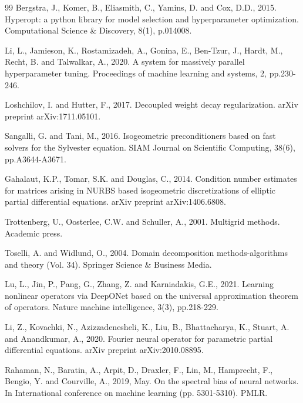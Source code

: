 \documentclass{article}
\theoremstyle{plain}
\numberwithin{equation}{section}
\begin{document}
\begin{thebibliography}{99}
    Bergstra, J., Komer, B., Eliasmith, C., Yamins, D. and Cox, D.D., 2015. Hyperopt: a python library for model selection and hyperparameter optimization. Computational Science $\&$ Discovery, 8(1), p.014008.

    Li, L., Jamieson, K., Rostamizadeh, A., Gonina, E., Ben-Tzur, J., Hardt, M., Recht, B. and Talwalkar, A., 2020. A system for massively parallel hyperparameter tuning. Proceedings of machine learning and systems, 2, pp.230-246.

    Loshchilov, I. and Hutter, F., 2017. Decoupled weight decay regularization. arXiv preprint arXiv:1711.05101.

    Sangalli, G. and Tani, M., 2016. Isogeometric preconditioners based on fast solvers for the Sylvester equation. SIAM Journal on Scientific Computing, 38(6), pp.A3644-A3671.

    Gahalaut, K.P., Tomar, S.K. and Douglas, C., 2014. Condition number estimates for matrices arising in NURBS based isogeometric discretizations of elliptic partial differential equations. arXiv preprint arXiv:1406.6808.

    Trottenberg, U., Oosterlee, C.W. and Schuller, A., 2001. Multigrid methods. Academic press.

    Toselli, A. and Widlund, O., 2004. Domain decomposition methods-algorithms and theory (Vol. 34). Springer Science $\&$ Business Media.

    Lu, L., Jin, P., Pang, G., Zhang, Z. and Karniadakis, G.E., 2021. Learning nonlinear operators via DeepONet based on the universal approximation theorem of operators. Nature machine intelligence, 3(3), pp.218-229.

    Li, Z., Kovachki, N., Azizzadenesheli, K., Liu, B., Bhattacharya, K., Stuart, A. and Anandkumar, A., 2020. Fourier neural operator for parametric partial differential equations. arXiv preprint arXiv:2010.08895.

    Rahaman, N., Baratin, A., Arpit, D., Draxler, F., Lin, M., Hamprecht, F., Bengio, Y. and Courville, A., 2019, May. On the spectral bias of neural networks. In International conference on machine learning (pp. 5301-5310). PMLR.


\end{thebibliography}
\end{document}
